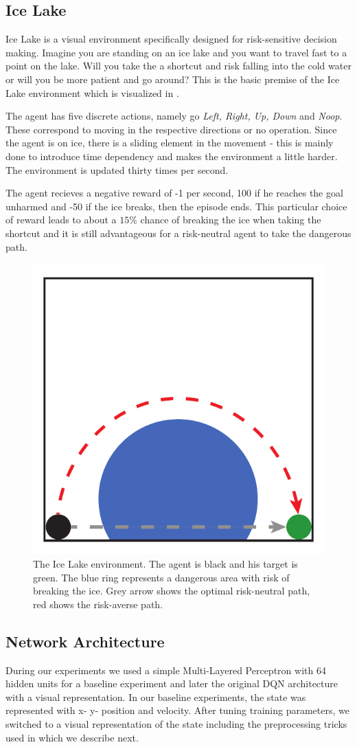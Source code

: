 \subsection{Ice Lake}
Ice Lake is a visual environment specifically designed for risk-sensitive decision making. Imagine you are standing on an ice lake and you want to travel fast to a point on the lake. Will you take the a shortcut and risk falling into the cold water or will you be more patient and go around? This is the basic premise of the Ice Lake environment which is visualized in .

The agent has five discrete actions, namely go \textit{Left, Right, Up, Down} and \textit{Noop}. These correspond to moving in the respective directions or no operation. Since the agent is on ice, there is a sliding element in the movement - this is mainly done to introduce time dependency and makes the environment a little harder. The environment is updated thirty times per second.

The agent recieves a negative reward of -1 per second, 100 if he reaches the goal unharmed and -50 if the ice breaks, then the episode ends. This particular choice of reward leads to about a $15\%$ chance of breaking the ice when taking the shortcut and it is still advantageous for a risk-neutral agent to take the dangerous path.

\begin{figure}[h]
\center
\includegraphics[width=0.3\linewidth]{gfx/icelake_still.pdf}
\caption[The Ice Lake environment.]{The Ice Lake environment. The agent is black and his target is green. The blue ring represents a dangerous area with risk of breaking the ice. Grey arrow shows the optimal risk-neutral path, red shows the risk-averse path.}
\label{fig:icelake}
\end{figure}

\subsection{Network Architecture}
During our experiments we used a simple Multi-Layered Perceptron with 64 hidden units for a baseline experiment and later the original DQN architecture with a visual representation. In our baseline experiments, the state was represented with x- y- position and velocity. After tuning training parameters, we switched to a visual representation of the state including the preprocessing tricks used in \citet{mnih2015human} which we describe next.

